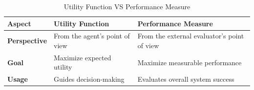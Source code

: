 \begin{customArrayStretch}{1.3}
\begin{table}[H]
\centering

\begin{tabular}{| l | l | l |}

\hline

\textbf{Aspect} & 
    \textbf{Utility Function} & 
    \textbf{Performance Measure} \\ \hline
    
\textbf{Perspective} & 
    From the agent’s point of view & 
    From the external evaluator’s point of view \\ \hline

\textbf{Goal} & 
    Maximize expected utility & 
    Maximize measurable performance \\ \hline

\textbf{Usage} & 
    Guides decision-making & 
    Evaluates overall system success \\ \hline

\end{tabular}

\caption*{Utility Function VS Performance Measure}
\end{table}
\end{customArrayStretch}














